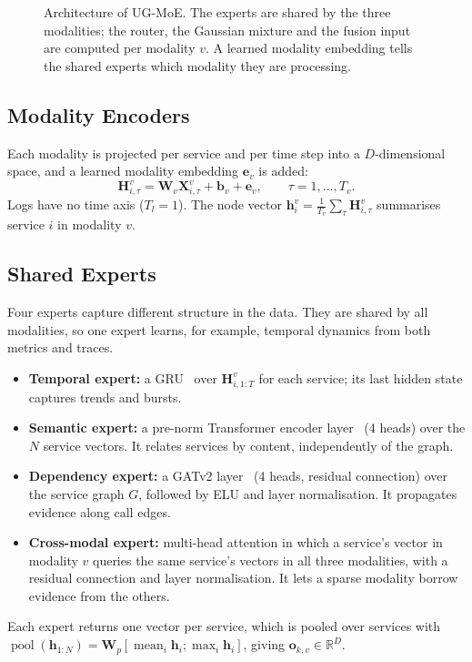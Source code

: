 \documentclass[journal]{IEEEtran}
\newcommand{\ugmoe}{UG-MoE}
\begin{document}
\begin{figure}[!t]
{}
\caption{Architecture of \ugmoe. The experts are shared by the three modalities; the router, the
Gaussian mixture and the fusion input are computed per modality $v$. A learned modality embedding tells the
shared experts which modality they are processing.}
\label{fig:arch}
\end{figure}

\subsection{Modality Encoders}
\label{sec:enc}
Each modality is projected per service and per time step into a $D$-dimensional space, and a learned
modality embedding $\bm{e}_v$ is added:
\begin{equation}
  \bm{H}^{v}_{i,\tau} = \bm{W}_v \bm{X}^{v}_{i,\tau} + \bm{b}_v + \bm{e}_v ,\qquad \tau=1,\dots,T_v .
\end{equation}
Logs have no time axis ($T_l=1$). The node vector $\bm{h}^v_i=\frac{1}{T_v}\sum_\tau\bm{H}^v_{i,\tau}$
summarises service $i$ in modality $v$.

\subsection{Shared Experts}
\label{sec:experts}
Four experts capture different structure in the data. They are shared by all modalities, so one expert
learns, for example, temporal dynamics from both metrics and traces.
\begin{itemize}
  \item \textbf{Temporal expert:} a GRU~\cite{cho2014gru} over $\bm{H}^v_{i,1:T}$ for each service; its last hidden
  state captures trends and bursts.
  \item \textbf{Semantic expert:} a pre-norm Transformer encoder layer~\cite{vaswani2017attention}
  (4 heads) over the $N$ service vectors. It relates services by content, independently of the graph.
  \item \textbf{Dependency expert:} a GATv2 layer~\cite{brody2022gatv2} (4 heads, residual connection) over
  the service graph $G$, followed by ELU and layer normalisation. It propagates evidence along call edges.
  \item \textbf{Cross-modal expert:} multi-head attention in which a service's vector in modality $v$
  queries the same service's vectors in all three modalities, with a residual connection and layer
  normalisation. It lets a sparse modality borrow evidence from the others.
\end{itemize}
Each expert returns one vector per service, which is pooled over services with
$\operatorname{pool}(\bm{h}_{1:N})=\bm{W}_p[\operatorname{mean}_i\bm{h}_i;\max_i\bm{h}_i]$, giving
$\bm{o}_{k,v}\in\mathbb{R}^D$.
\end{document}
